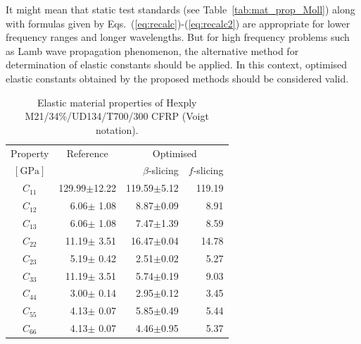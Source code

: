\documentclass[preprint,12pt]{elsarticle}
\begin{document}
It might mean that static test standards (see Table~\ref{tab:mat_prop_Moll}) along with formulas given by Eqs.~(\ref{eq:recalc})-(\ref{eq:recalc2}) are appropriate for lower frequency ranges and longer wavelengths.
But for high frequency problems such as Lamb wave propagation phenomenon, the alternative method for determination of elastic constants should be applied.
In this context, optimised elastic constants obtained by the proposed methods should be considered valid.
\begin{table}[h]
	\renewcommand{\arraystretch}{1.3}
	\centering \footnotesize
	\caption{Elastic material properties of Hexply M21/34\%/UD134/T700/300 CFRP (Voigt notation).}
	\begin{tabular}{crrr} 
		\toprule
		Property & \multicolumn{1}{c}{Reference} & \multicolumn{2}{c}{Optimised}\\
		\cmidrule(lr){3-4}
		$\left[\textrm{GPa}\right]$ & \multicolumn{1}{c}{\cite{Moll2019}} & $\beta$-slicing & $f$-slicing \\ 
		\midrule 
		$C_{11}$ & 129.99$\pm$12.22  & 119.59$\pm$5.12 & 119.19 \\ 
		$C_{12}$ &   6.06$\pm$ 1.08  &   8.87$\pm$0.09 &   8.91\\ 
		$C_{13}$ &   6.06$\pm$ 1.08  &   7.47$\pm$1.39 &   8.59\\
		$C_{22}$ &  11.19$\pm$ 3.51  &  16.47$\pm$0.04 &  14.78\\
		$C_{23}$ &   5.19$\pm$ 0.42  &   2.51$\pm$0.02 &   5.27\\
		$C_{33}$ &  11.19$\pm$ 3.51  &   5.74$\pm$0.19 &   9.03\\
		$C_{44}$ &   3.00$\pm$ 0.14  &   2.95$\pm$0.12 &   3.45\\
		$C_{55}$ &   4.13$\pm$ 0.07  &   5.85$\pm$0.49 &   5.44\\
		$C_{66}$ &   4.13$\pm$ 0.07  &   4.46$\pm$0.95 &   5.37 \\
		\bottomrule
	\end{tabular} 
	\label{tab:mat_prop_identified_Moll}
\end{table}
\end{document}
